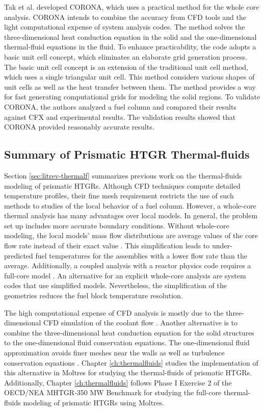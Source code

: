 Tak et al. \cite{tak_practical_2012} \cite{tak_development_2014} developed CORONA, which uses a practical method for the whole core analysis.
CORONA intends to combine the accuracy from CFD tools and the light computational expense of system analysis codes.
The method solves the three-dimensional heat conduction equation in the solid and the one-dimensional thermal-fluid equations in the fluid.
To enhance practicability, the code adopts a basic unit cell concept, which eliminates an elaborate grid generation process.
The basic unit cell concept is an extension of the traditional unit cell method, which uses a single triangular unit cell.
This method considers various shapes of unit cells as well as the heat transfer between them.
The method provides a way for fast generating computational grids for modeling the solid regions.
To validate CORONA, the authors analyzed a fuel column and compared their results against CFX and experimental results.
The validation results showed that CORONA provided reasonably accurate results.

\subsection{Summary of Prismatic HTGR Thermal-fluids}

Section \ref{sec:litrev-thermalf} summarizes previous work on the thermal-fluids modeling of prismatic HTGRs.
Although CFD techniques compute detailed temperature profiles, their fine mesh requirement restricts the use of such methods to studies of the local behavior of a fuel column.
However, a whole-core thermal analysis has many advantages over local models.
In general, the problem set up includes more accurate boundary conditions.
Without whole-core modeling, the local models' mass flow distributions are average values of the core flow rate instead of their exact value \cite{huning_novel_2016}.
This simplification leads to under-predicted fuel temperatures for the assemblies with a lower flow rate than the average.
Additionally, a coupled analysis with a reactor physics code requires a full-core model \cite{tak_practical_2012}.
An alternative for an explicit whole-core analysis are system codes that use simplified models.
Nevertheless, the simplification of the geometries reduces the fuel block temperature resolution.


The high computational expense of CFD analysis is mostly due to the three-dimensional CFD simulation of the coolant flow \cite{travis_thermalhydraulics_2013}.
Another alternative is to combine the three-dimensional heat conduction equation for the solid structures to the one-dimensional fluid conservation equations.
The one-dimensional fluid approximation avoids finer meshes near the walls as well as turbulence conservation equations \cite{tak_development_2014}.
Chapter \ref{ch:thermalfluids} studies the implementation of this alternative in Moltres for studying the thermal-fluids of prismatic HTGRs.
Additionally, Chapter \ref{ch:thermalfluids} follows Phase I Exercise 2 of the OECD/NEA MHTGR-350 MW Benchmark for studying the full-core thermal-fluids modeling of prismatic HTGRs using Moltres.


